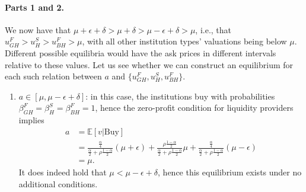 \begin{solution}
	\paragraph{Parts 1 and 2.}
	We now have that $\mu + \epsilon + \delta > \mu + \delta > \mu - \epsilon + \delta > \mu$, i.e., that $u^F_{GH} > u^S_H > u^F_{BH} > \mu$, with all other institution types' valuations being below $\mu$. Different possible equilibria would have the ask prices in different intervals relative to these values. Let us see whether we can construct an equilibrium for each such relation between $a$ and $\{u^F_{GH}, u^S_H, u^F_{BH}\}$.
	\begin{enumerate}
		\item $a \in [\mu, \mu - \epsilon + \delta]$: in this case, the institutions buy with probabilities $\beta^F_{GH} = \beta^S_H = \beta^F_{BH} = 1$, hence the zero-profit condition for liquidity providers implies
		\begin{align*}
			a &= \mathbb{E}[v | \text{Buy}]
			\\
			&= \frac{\frac{\alpha}{4}}{\frac{\alpha}{2} + \rho \frac{1-\alpha}{2}} (\mu + \epsilon) 
			+ \frac{\rho \frac{1-\alpha}{2}}{\frac{\alpha}{2} + \rho \frac{1-\alpha}{2}} \mu 
			+ \frac{\frac{\alpha}{4}}{\frac{\alpha}{2} + \rho \frac{1-\alpha}{2}} (\mu - \epsilon)
			\\
			&= \mu.
		\end{align*}
		It does indeed hold that $\mu < \mu - \epsilon + \delta$, hence this equilibrium exists under no additional conditions.
		

\end{enumerate}
\end{solution}
